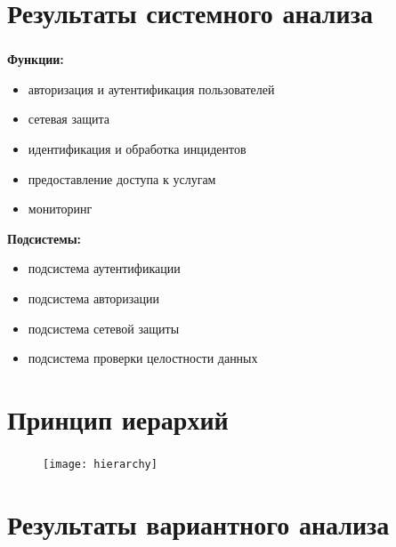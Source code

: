 
\section{Результаты системного анализа}

\begin{frame}
\frametitle{\insertsection}

\textbf{Функции:}
\begin{itemize}
    \item авторизация и аутентификация пользователей
    \item сетевая защита
    \item идентификация и обработка инцидентов
    \item предоставление доступа к услугам
    \item мониторинг
\end{itemize}

\vspace{\baselineskip}

\textbf{Подсистемы:}
\begin{itemize}
    \item подсистема аутентификации
    \item подсистема авторизации
    \item подсистема сетевой защиты
    \item подсистема проверки целостности данных
\end{itemize}
\end{frame}


\section{Принцип иерархий}

\begin{frame}
\frametitle{\insertsection}

\begin{figure}
    \center
    \texttt{[image: hierarchy]}
\end{figure}
\end{frame}


\section{Результаты вариантного анализа}


